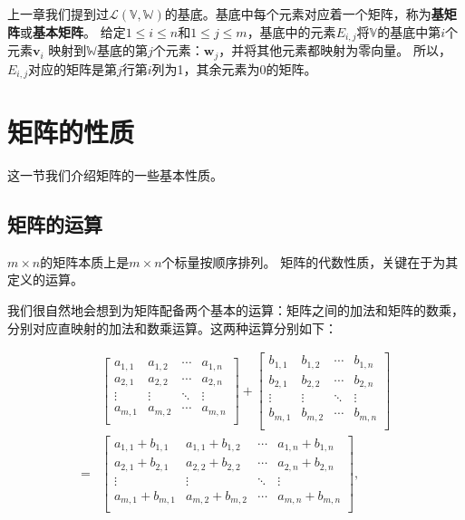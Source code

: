 \documentclass[12pt,UTF8]{ctexbook}
\begin{document}
上一章我们提到过$\mathcal{L}(\mathbb{V}, \mathbb{W})$的基底。基底中每个元素对应着一个矩阵，称为\textbf{基矩阵}或\textbf{基本矩阵}。
给定$1\leq i \leq n$和$1\leq j \leq m$，基底中的元素$E_{i,j}$将$\mathbb{V}$的基底中第$i$个元素$\mathbf{v}_i$
映射到$\mathbb{W}$基底的第$j$个元素：$\mathbf{w}_j$，并将其他元素都映射为零向量。
所以，$E_{i,j}$对应的矩阵是第$j$行第$i$列为1，其余元素为0的矩阵。

\section{矩阵的性质}

这一节我们介绍矩阵的一些基本性质。

\subsection{矩阵的运算}
$m\times n$的矩阵本质上是$m\times n$个标量按顺序排列。
矩阵的代数性质，关键在于为其定义的运算。

我们很自然地会想到为矩阵配备两个基本的运算：矩阵之间的加法和矩阵的数乘，分别对应直映射的加法和数乘运算。这两种运算分别如下：

\begin{align*}
&\begin{bmatrix}
 a_{1,1}     & a_{1,2}   & \cdots & a_{1,n} \\
 a_{2,1}     & a_{2,2}   & \cdots & a_{2,n} \\
 \vdots      & \vdots    & \ddots & \vdots  \\
 a_{m,1}     & a_{m,2}   & \cdots & a_{m,n} \\
\end{bmatrix}
+
\begin{bmatrix}
    b_{1,1}     & b_{1,2}   & \cdots & b_{1,n} \\
    b_{2,1}     & b_{2,2}   & \cdots & b_{2,n} \\
    \vdots      & \vdots    & \ddots & \vdots  \\
    b_{m,1}     & b_{m,2}   & \cdots & b_{m,n} \\
\end{bmatrix}  \\
=&
\begin{bmatrix}
    a_{1,1} + b_{1,1}     & a_{1,1} + b_{1,2}   & \cdots & a_{1,n} + b_{1,n} \\
    a_{2,1} + b_{2,1}     & a_{2,2} + b_{2,2}   & \cdots & a_{2,n} + b_{2,n} \\
    \vdots                & \vdots              & \ddots &           \vdots  \\
    a_{m,1} + b_{m,1}     & a_{m,2} + b_{m,2}   & \cdots & a_{m,n} + b_{m,n} \\
\end{bmatrix} ,
\end{align*}
\end{document}
